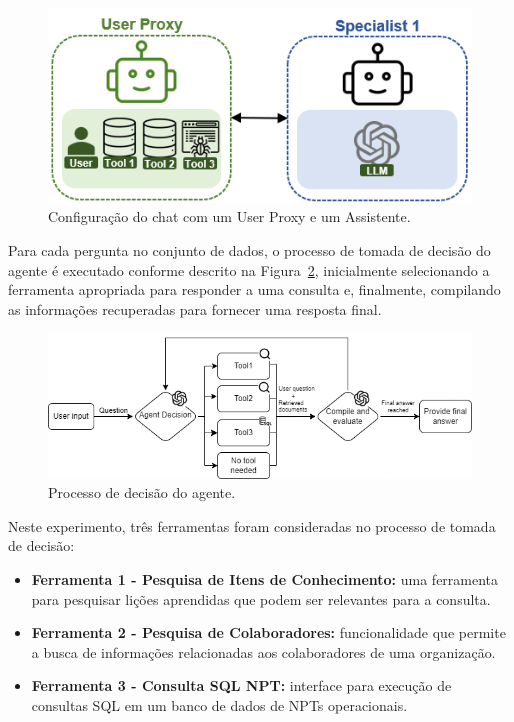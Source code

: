             \begin{figure}[hbt]
                \centering
                \includegraphics[width=.5\textwidth]{images/agent_config_1.png}
                \caption{Configuração do chat com um User Proxy \cite{Wu2023} e um Assistente.}
                \label{fig:agent_config_1}
            \end{figure}
            
            Para cada pergunta no conjunto de dados, o processo de tomada de decisão do agente é executado conforme descrito na Figura~\ref{fig:diagrama_agente_1}, inicialmente selecionando a ferramenta apropriada para responder a uma consulta e, finalmente, compilando as informações recuperadas para fornecer uma resposta final.
            
            \begin{figure}[h]
                \centering
                \includegraphics[width=1\textwidth]{images/agent_diagram_1.png}
                \caption{Processo de decisão do agente.}
                \label{fig:diagrama_agente_1}
            \end{figure}
    
    
    
            
            Neste experimento, três ferramentas foram consideradas no processo de tomada de decisão:
            
            \begin{itemize}
            
                \item \textbf{Ferramenta 1 - Pesquisa de Itens de Conhecimento:} uma ferramenta para pesquisar lições aprendidas que podem ser relevantes para a consulta.
                
            
                \item \textbf{Ferramenta 2 - Pesquisa de Colaboradores:} funcionalidade que permite a busca de informações relacionadas aos colaboradores de uma organização.
            
                \item  \textbf{Ferramenta 3 - Consulta SQL NPT:} interface para execução de consultas SQL em um banco de dados de NPTs operacionais. 
            
            \end{itemize}
            
